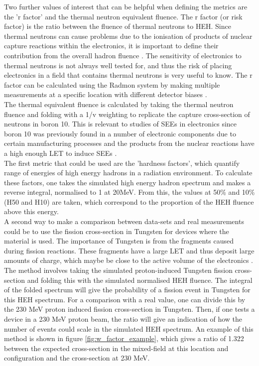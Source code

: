 Two further values of interest that can be helpful when defining the metrics are the 'r factor' and the thermal neutron equivalent fluence. The r factor (or risk factor) is the ratio between the fluence of thermal neutrons to HEH. Since thermal neutrons can cause problems due to the ionisation of products of nuclear capture reactions within the electronics, it is important to define their contribution from the overall hadron fluence \cite{Baumann2001211}. The sensitivity of electronics to thermal neutrons is not always well tested for, and thus the risk of placing electronics in a field that contains thermal neutrons is very useful to know. The r factor can be calculated using the Radmon system by making multiple measurements at a specific location with different detector biases \cite{Kramer:1399765}. \\

The thermal equivalent fluence is calculated by taking the thermal neutron fluence and folding with a 1/v weighting to replicate the capture cross-section of neutrons in boron 10. This is relevant to studies of SEEs in electronics since boron 10 was previously found in a number of electronic components due to certain manufacturing processes and the products from the nuclear reactions have a high enough LET to induce SEEs \cite{Baumann2001211}.\\

The first metric that could be used are the 'hardness factors', which quantify range of energies of high energy hadrons in a radiation environment. To calculate these factors, one takes the simulated high energy hadron spectrum and makes a reverse integral, normalised to 1 at 20MeV. From this, the values at 50\% and 10\% (H50 and H10) are taken, which correspond to the proportion of the HEH fluence above this energy. \\

A second way to make a comparison between data-sets and real measurements could be to use the fission cross-section in Tungsten for devices where the material is used. The importance of Tungsten is from the fragments caused during fission reactions. These fragments have a large LET and thus deposit large amounts of charge, which maybe be close to the active volume of the electronics \cite{1589248}. \\

The method involves taking the simulated proton-induced Tungsten fission cross-section and folding this with the simulated normalised HEH fluence. The integral of the folded spectrum will give the probability of a fission event in Tungsten for this HEH spectrum. For a comparison with a real value, one can divide this by the 230 MeV proton induced fission cross-section in Tungsten. Then, if one tests a device in a 230 MeV proton beam, the ratio will give an indication of how the number of events could scale in the simulated HEH spectrum. An example of this method is shown in figure \ref{fig:w_factor_example}, which gives a ratio of 1.322 between the expected cross-section in the mixed-field at this location and configuration and the cross-section at 230 MeV. \\

